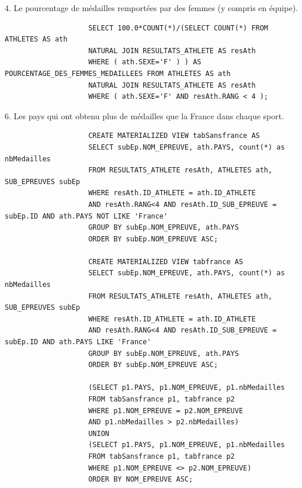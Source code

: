 \documentclass[]{scrreprt}
\begin{document}
			\vspace{0.5cm}
		
			{\large 
				4. Le pourcentage de médailles remportées par des femmes (y compris en équipe).
				
			}
			
			{\footnotesize 
				\begin{tcolorbox}
					\begin{verbatim}
					SELECT 100.0*COUNT(*)/(SELECT COUNT(*) FROM ATHLETES AS ath 
					NATURAL JOIN RESULTATS_ATHLETE AS resAth
					WHERE ( ath.SEXE='F' ) ) AS POURCENTAGE_DES_FEMMES_MEDAILLEES FROM ATHLETES AS ath 
					NATURAL JOIN RESULTATS_ATHLETE AS resAth
					WHERE ( ath.SEXE='F' AND resAth.RANG < 4 );
					\end{verbatim}
				\end{tcolorbox}
			}
		
			\vspace{0.5cm}
			
			{\large 
				6. Les pays qui ont obtenu plus de médailles que la France dans chaque sport.
				
			}
			
			{\footnotesize 
				\begin{tcolorbox}
					\begin{verbatim}
					CREATE MATERIALIZED VIEW tabSansfrance AS
					SELECT subEp.NOM_EPREUVE, ath.PAYS, count(*) as nbMedailles
					FROM RESULTATS_ATHLETE resAth, ATHLETES ath, SUB_EPREUVES subEp
					WHERE resAth.ID_ATHLETE = ath.ID_ATHLETE 
					AND resAth.RANG<4 AND resAth.ID_SUB_EPREUVE = subEp.ID AND ath.PAYS NOT LIKE 'France'
					GROUP BY subEp.NOM_EPREUVE, ath.PAYS
					ORDER BY subEp.NOM_EPREUVE ASC;
					
					CREATE MATERIALIZED VIEW tabfrance AS
					SELECT subEp.NOM_EPREUVE, ath.PAYS, count(*) as nbMedailles
					FROM RESULTATS_ATHLETE resAth, ATHLETES ath, SUB_EPREUVES subEp
					WHERE resAth.ID_ATHLETE = ath.ID_ATHLETE 
					AND resAth.RANG<4 AND resAth.ID_SUB_EPREUVE = subEp.ID AND ath.PAYS LIKE 'France'
					GROUP BY subEp.NOM_EPREUVE, ath.PAYS
					ORDER BY subEp.NOM_EPREUVE ASC;
					
					(SELECT p1.PAYS, p1.NOM_EPREUVE, p1.nbMedailles
					FROM tabSansfrance p1, tabfrance p2
					WHERE p1.NOM_EPREUVE = p2.NOM_EPREUVE
					AND p1.nbMedailles > p2.nbMedailles)
					UNION
					(SELECT p1.PAYS, p1.NOM_EPREUVE, p1.nbMedailles
					FROM tabSansfrance p1, tabfrance p2
					WHERE p1.NOM_EPREUVE <> p2.NOM_EPREUVE)
					ORDER BY NOM_EPREUVE ASC;
					\end{verbatim}
				\end{tcolorbox}
			}
		
\end{document}
